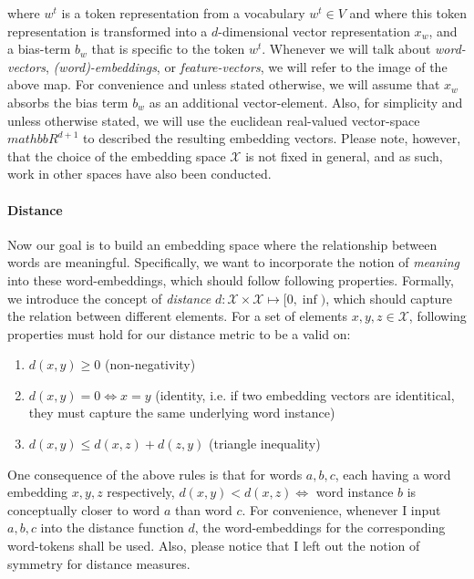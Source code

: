 \documentclass[a4paper,12pt,twoside,openright]{report}
\begin{document}
where $w^t$ is a token representation from a vocabulary $w^t \in V$ and where this token representation is transformed into a $d$-dimensional vector representation $x_w$, and a bias-term $b_w$ that is specific to the token $w^t$.
Whenever we will talk about \textit{word-vectors}, \textit{(word)-embeddings}, or \textit{feature-vectors}, we will refer to the image of the above map. 
For convenience and unless stated otherwise, we will assume that $x_w$ absorbs the bias term $b_w$ as an additional vector-element.
Also, for simplicity and unless otherwise stated, we will use the euclidean real-valued vector-space $mathbb{R}^{d+1}$ to described the resulting embedding vectors.
Please note, however, that the choice of the embedding space $\mathcal{X}$ is not fixed in general, and as such, work in other spaces have also been conducted. 


\paragraph{Distance} Now our goal is to build an embedding space where the relationship between words are meaningful.
Specifically, we want to incorporate the notion of \textit{meaning} into these word-embeddings, which should follow following properties.
Formally, we introduce the concept of \textit{distance} $d : \mathcal{X}  \times \mathcal{X} \mapsto [ 0, \inf )$, which should capture the relation between different elements. 
For a set of elements $x, y, z \in \mathcal{X}$, following properties must hold for our distance metric to be a valid on:

\begin{enumerate}
\item $d(x, y) \geq 0$ (non-negativity)
\item $d(x, y) = 0 \iff x = y$ (identity, i.e. if two embedding vectors are identitical, they must capture the same underlying word instance)
\item $d(x, y) \leq d(x, z) + d(z, y)$ (triangle inequality)
\end{enumerate}{\label{def:distance}}

One consequence of the above rules is that for words $a, b, c$, each having a word embedding $x, y, z$ respectively, $d(x, y) < d(x, z) \iff $ word instance $b$ is conceptually closer to word $a$ than word $c$.
For convenience, whenever I input $a, b, c$ into the distance function $d$, the word-embeddings for the corresponding word-tokens shall be used.
Also, please notice that I left out the notion of symmetry for distance measures.
\end{document}
